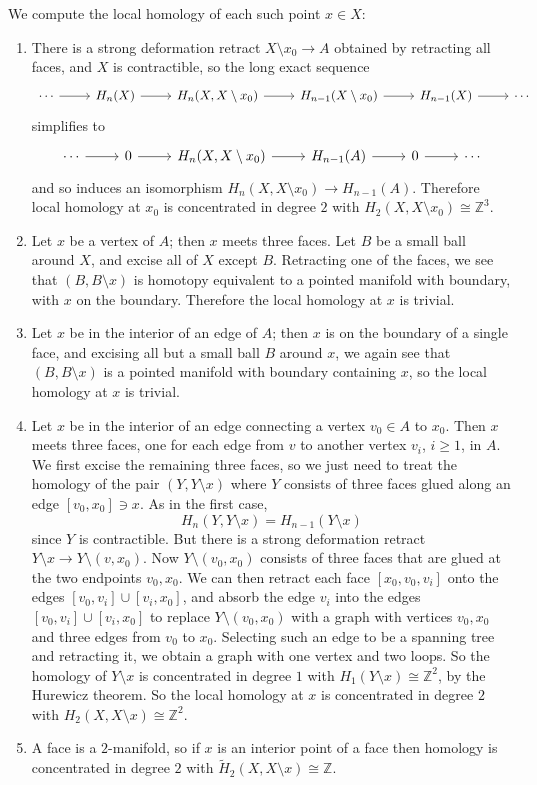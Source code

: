 \documentclass[10pt]{article}
\newcommand{\ZZ}{\mathbb{Z}}
\theoremstyle{definition}
\begin{document}
We compute the local homology of each such point $x \in X$:
\begin{enumerate}
\item There is a strong deformation retract $X \setminus x_0 \to A$ obtained by retracting all faces, and $X$ is contractible, so the long exact sequence
$$\begin{tikzcd}
\cdots \arrow[r] & H_n(X) \arrow[r] & H_n(X, X \setminus x_0) \arrow[r] & H_{n-1}(X \setminus x_0) \arrow[r] & H_{n-1}(X) \arrow[r] & \cdots
\end{tikzcd}$$
simplifies to
$$\begin{tikzcd}
\cdots \arrow[r] & 0 \arrow[r] & H_n(X, X \setminus x_0) \arrow[r] & H_{n-1}(A) \arrow[r] & 0 \arrow[r] & \cdots
\end{tikzcd}$$
and so induces an isomorphism $H_n(X, X \setminus x_0) \to H_{n-1}(A)$. Therefore local homology at $x_0$ is concentrated in degree $2$ with $H_2(X, X \setminus x_0) \cong \ZZ^3$.
\item Let $x$ be a vertex of $A$; then $x$ meets three faces. Let $B$ be a small ball around $X$, and excise all of $X$ except $B$. Retracting one of the faces, we see that $(B, B \setminus x)$ is homotopy equivalent to a pointed manifold with boundary, with $x$ on the boundary. Therefore the local homology at $x$ is trivial.
\item Let $x$ be in the interior of an edge of $A$; then $x$ is on the boundary of a single face, and excising all but a small ball $B$ around $x$, we again see that $(B, B \setminus x)$ is a pointed manifold with boundary containing $x$, so the local homology at $x$ is trivial.
\item Let $x$ be in the interior of an edge connecting a vertex $v_0 \in A$ to $x_0$. Then $x$ meets three faces, one for each edge from $v$ to another vertex $v_i$, $i \geq 1$, in $A$.
We first excise the remaining three faces, so we just need to treat the homology of the pair $(Y, Y \setminus x)$ where $Y$ consists of three faces glued along an edge $[v_0, x_0] \ni x$.
As in the first case,
$$H_n(Y, Y \setminus x) = H_{n-1}(Y \setminus x)$$
since $Y$ is contractible. But there is a strong deformation retract $Y \setminus x \to Y \setminus (v, x_0)$.
Now $Y \setminus (v_0, x_0)$ consists of three faces that are glued at the two endpoints $v_0, x_0$.
We can then retract each face $[x_0, v_0, v_i]$ onto the edges $[v_0, v_i] \cup [v_i, x_0]$, and absorb the edge $v_i$ into the edges $[v_0, v_i] \cup [v_i, x_0]$ to replace $Y \setminus (v_0, x_0)$ with a graph with vertices $v_0, x_0$ and three edges from $v_0$ to $x_0$.
Selecting such an edge to be a spanning tree and retracting it, we obtain a graph with one vertex and two loops. So the homology of $Y \setminus x$ is concentrated in degree $1$ with $H_1(Y \setminus x) \cong \ZZ^2$, by the Hurewicz theorem.
So the local homology at $x$ is concentrated in degree $2$ with $H_2(X, X \setminus x) \cong \ZZ^2$.
\item A face is a $2$-manifold, so if $x$ is an interior point of a face then homology is concentrated in degree $2$ with $\widetilde H_2(X, X \setminus x) \cong \ZZ$.
\end{enumerate}
\end{document}
